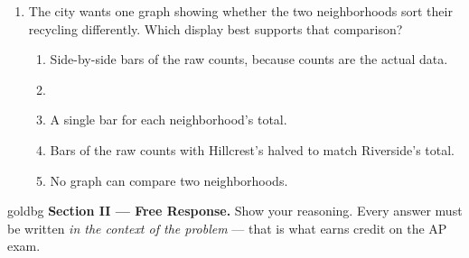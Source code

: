 \documentclass[12pt]{article}
\begin{document}
\begin{enumerate}[leftmargin=1.9em, itemsep=0.13in]
  \item The city wants one graph showing whether the two neighborhoods sort their recycling
        differently. Which display best supports that comparison?
        \begin{enumerate}[label=\textbf{(\Alph*)}, leftmargin=2.2em, itemsep=2pt]
          \item Side-by-side bars of the raw counts, because counts are the actual data.
          \item {}
          \item A single bar for each neighborhood's total.
          \item Bars of the raw counts with Hillcrest's halved to match Riverside's total.
          \item No graph can compare two neighborhoods.
                \hfill{}
        \end{enumerate}

\end{enumerate}

\vspace{0.14in}

\boxguard[16]
\begin{headlinebox}{goldbg}
\small
\textbf{Section II --- Free Response.} Show your reasoning. Every answer must be written
\emph{in the context of the problem} --- that is what earns credit on the AP exam.
\end{headlinebox}

\vspace{0.10in}
\end{document}
